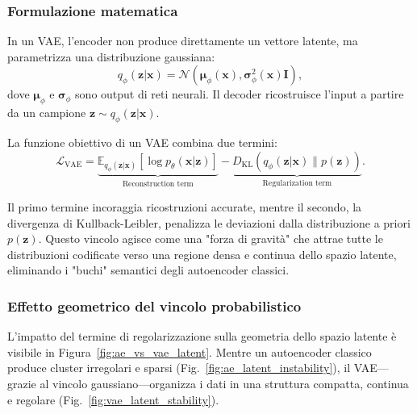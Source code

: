 \subsubsection{Formulazione matematica}

In un VAE, l'encoder non produce direttamente un vettore latente, ma parametrizza una distribuzione gaussiana:
\begin{equation}
    q_\phi(\mathbf{z}|\mathbf{x}) = \mathcal{N}(\boldsymbol{\mu}_\phi(\mathbf{x}), \boldsymbol{\sigma}_\phi^2(\mathbf{x}) \mathbf{I}),
\end{equation}
dove $\boldsymbol{\mu}_\phi$ e $\boldsymbol{\sigma}_\phi$ sono output di reti neurali. Il decoder ricostruisce l'input a partire da un campione $\mathbf{z} \sim q_\phi(\mathbf{z}|\mathbf{x})$.

La funzione obiettivo di un VAE combina due termini:
\begin{equation}
    \mathcal{L}_{\text{VAE}} = \underbrace{\mathbb{E}_{q_\phi(\mathbf{z}|\mathbf{x})}[\log p_\theta(\mathbf{x}|\mathbf{z})]}_{\text{Reconstruction term}} - \underbrace{D_{\mathrm{KL}}(q_\phi(\mathbf{z}|\mathbf{x}) \| p(\mathbf{z}))}_{\text{Regularization term}}.
    \label{eq:vae_loss}
\end{equation}

Il primo termine incoraggia ricostruzioni accurate, mentre il 
secondo, la divergenza di Kullback-Leibler, penalizza 
le deviazioni dalla distribuzione a priori $p(\mathbf{z})$. Questo vincolo agisce come una "forza di gravità" che attrae tutte le distribuzioni codificate verso una regione densa e continua dello spazio latente, eliminando i "buchi" semantici degli autoencoder classici.

\subsubsection{Effetto geometrico del vincolo probabilistico}

L'impatto del termine di regolarizzazione sulla geometria dello spazio latente è visibile in Figura~\ref{fig:ae_vs_vae_latent}. Mentre un autoencoder classico produce cluster irregolari e sparsi (Fig.~\ref{fig:ae_latent_instability}), il VAE—grazie al vincolo gaussiano—organizza i dati in una struttura compatta, continua e regolare (Fig.~\ref{fig:vae_latent_stability}).

